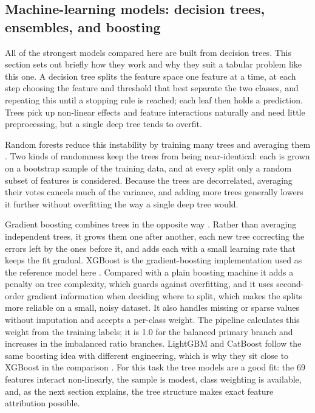\documentclass[12pt,twoside]{article}
\begin{document}
\subsection{Machine-learning models: decision trees, ensembles, and boosting}
\label{sec:methods_models_background}

All of the strongest models compared here are built from decision trees. This section sets out briefly how they work and why they suit a tabular problem like this one. A decision tree splits the feature space one feature at a time, at each step choosing the feature and threshold that best separate the two classes, and repeating this until a stopping rule is reached; each leaf then holds a prediction. Trees pick up non-linear effects and feature interactions naturally and need little preprocessing, but a single deep tree tends to overfit.

Random forests reduce this instability by training many trees and averaging them \citep{breiman2001random}. Two kinds of randomness keep the trees from being near-identical: each is grown on a bootstrap sample of the training data, and at every split only a random subset of features is considered. Because the trees are decorrelated, averaging their votes cancels much of the variance, and adding more trees generally lowers it further without overfitting the way a single deep tree would.

Gradient boosting combines trees in the opposite way \citep{friedman2001greedy}. Rather than averaging independent trees, it grows them one after another, each new tree correcting the errors left by the ones before it, and adds each with a small learning rate that keeps the fit gradual. XGBoost is the gradient-boosting implementation used as the reference model here \citep{chen2016xgboost}. Compared with a plain boosting machine it adds a penalty on tree complexity, which guards against overfitting, and it uses second-order gradient information when deciding where to split, which makes the splits more reliable on a small, noisy dataset. It also handles missing or sparse values without imputation and accepts a per-class weight. The pipeline calculates this weight from the training labels; it is 1.0 for the balanced primary branch and increases in the imbalanced ratio branches. LightGBM and CatBoost follow the same boosting idea with different engineering, which is why they sit close to XGBoost in the comparison \citep{ke2017lightgbm,prokhorenkova2018catboost}. For this task the tree models are a good fit: the 69 features interact non-linearly, the sample is modest, class weighting is available, and, as the next section explains, the tree structure makes exact feature attribution possible.
\end{document}
